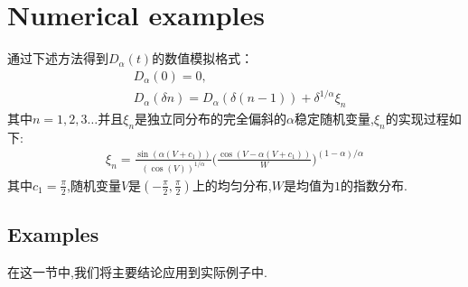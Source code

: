 \documentclass[12pt,final]{article}
\numberwithin{equation}{section}
\numberwithin{figure}{section}
\numberwithin{table}{section}
\theoremstyle{plain}
\theoremstyle{definition}
\theoremstyle{remark}
\begin{document}
	\section{Numerical examples}
	通过下述方法得到$D_\alpha(t)$的数值模拟格式：\\
	\begin{align*}
		&D_{\alpha}(0)=0,\\
		&D_{\alpha}(\delta n)=D_{\alpha}(\delta(n-1))+\delta^{1/\alpha}\xi_{n}
	\end{align*}
	其中$n=1,2,3 \ldots$并且$\xi_n$是独立同分布的完全偏斜的$\alpha$稳定随机变量,$\xi_n$的实现过程如下:
	\begin{align*}
		\xi_n=\frac{\sin(\alpha(V+c_1))}{\left(\cos(V)\right)^{1/\alpha}}\Big(\frac{\cos(V-\alpha(V+c_1))}{W}\Big)^{(1-\alpha)/\alpha}
	\end{align*}
	其中$c_1 = \frac{\pi}{2}$,随机变量$V$是$(-\frac{\pi}{2},\frac{\pi}{2})$上的均匀分布,$W$是均值为$1$的指数分布.
	\subsection{Examples}
	在这一节中,我们将主要结论应用到实际例子中.
\end{document}
